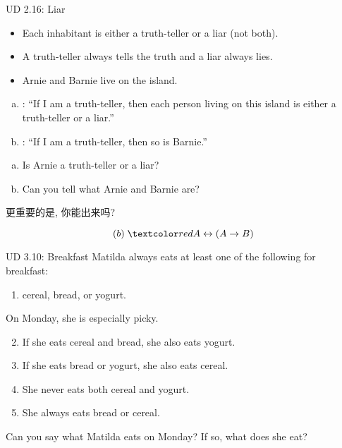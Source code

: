 
\begin{frame}{}
  \begin{exampleblock}{UD 2.16: Liar}
    \begin{itemize}
      \item Each inhabitant is either a truth-teller or a liar (not both).
      \item A truth-teller always tells the truth and a liar always lies.
      \item Arnie and Barnie live on the island.
    \end{itemize}

    \pause
    \begin{enumerate}[(a)]
      \item {}: ``If I am a truth-teller, then each person living on this island is either a truth-teller or a liar.''
      \item {}: ``If I am a truth-teller, then so is Barnie.''
    \end{enumerate}
  \end{exampleblock}

  \pause
  \vspace{0.20cm}
  \begin{enumerate}[(a)]
    \item Is Arnie a truth-teller or a liar?
    \item Can you tell what Arnie and Barnie are?
  \end{enumerate}

  \vspace{0.20cm}
  \pause
  \centerline{更重要的是, 你能出来吗?}
  \pause
  \[
    (b) \; \red{A \leftrightarrow (A \to B)}
  \]
\end{frame}

\begin{frame}{}
  \begin{exampleblock}{UD 3.10: Breakfast}
    Matilda always eats at least one of the following for breakfast: \\
    \begin{enumerate}
      \item cereal, bread, or yogurt. 
    \end{enumerate}
    On Monday, she is especially picky.

    \begin{enumerate}
      \setcounter{enumi}{1}
      \item If she eats cereal and bread, she also eats yogurt.
      \item If she eats bread or yogurt, she also eats cereal.
      \item She never eats both cereal and yogurt.
      \item She always eats bread or cereal.
    \end{enumerate}

    Can you say what Matilda eats on Monday? If so, what does she eat?
  \end{exampleblock}
\end{frame}

